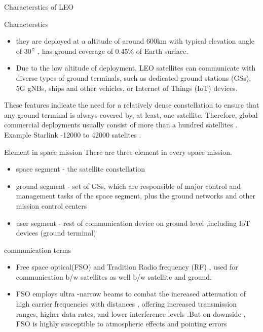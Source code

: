 \documentclass{beamer}
\begin{document}

\begin{frame}{Characterstics of LEO}
\begin{block}{Characterstics}
\begin{itemize}
\item they are deployed at a altitude of around 600km with typical elevation angle of 30$\degree$ , has ground coverage of 0.45\% of Earth surface.
 \item Due to the low altitude of deployment, LEO satellites can communicate with diverse types of ground terminals, such as dedicated ground stations
(GSs), 5G gNBs, ships and other vehicles, or Internet of
 Things (IoT) devices.
\end{itemize}
These features indicate  the need for a relatively dense constellation to ensure that any ground terminal is always covered by, at least,
one satellite. Therefore, global commercial deployments usually consist of more than a hundred satellites . Example Starlink -12000 to 42000 satelites .
\end{block}
\end{frame}

\begin{frame}
\begin{block}{Element in space mission}
There are three element in every space mission. 
\begin{itemize}
    \item space segment - the satellite constellation 
    \item ground segment - set of GSs, which are responsible of major control and management tasks of the space segment, plus the ground networks and other mission control centers
    \item user segment - rest of communication device on ground level ,including IoT devices (ground terminal) 
\end{itemize}
\end{block}
\begin{block}{communication terms}
\begin{itemize}
    \item Free space optical(FSO) and Tradition Radio frequency (RF) , used for communication b/w satellites
    as well b/w satellite and ground.
    \item FSO employs ultra -narrow beams to combat the increased attenuation of high carrier frequencies with distances , offering increased transmission ranges, higher data rates, and lower interference levels .But on downside , FSO is highly susceptible to atmospheric effects and pointing errors
\end{itemize}
\end{block}
\end{frame}
 
\end{document}
